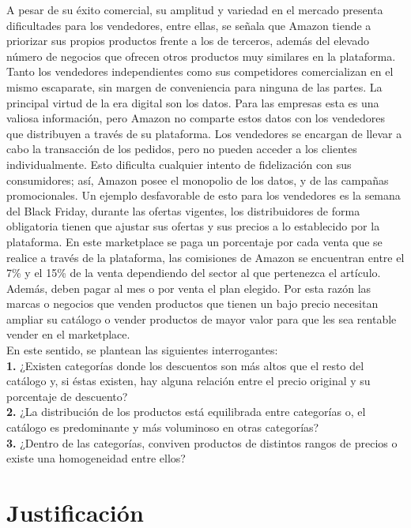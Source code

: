\documentclass[oneside,11pt]{Latex/Classes/PhDthesisPSnPDF}
\begin{document}
A pesar de su éxito comercial, su amplitud y variedad en el mercado
presenta dificultades para los vendedores, entre ellas, se señala que
Amazon tiende a priorizar sus propios productos frente a los de
terceros, además del elevado número de negocios que ofrecen otros
productos muy similares en la plataforma. Tanto los vendedores
independientes como sus competidores comercializan en el mismo
escaparate, sin margen de conveniencia para ninguna de las partes. La
principal virtud de la era digital son los datos. Para las empresas esta
es una valiosa información, pero Amazon no comparte estos datos con los
vendedores que distribuyen a través de su plataforma. Los vendedores se
encargan de llevar a cabo la transacción de los pedidos, pero no pueden
acceder a los clientes individualmente. Esto dificulta cualquier intento
de fidelización con sus consumidores; así, Amazon posee el monopolio de
los datos, y de las campañas promocionales. Un ejemplo desfavorable de
esto para los vendedores es la semana del Black Friday, durante las
ofertas vigentes, los distribuidores de forma obligatoria tienen que
ajustar sus ofertas y sus precios a lo establecido por la plataforma. En
este marketplace se paga un porcentaje por cada venta que se realice a
través de la plataforma, las comisiones de Amazon se encuentran entre el
7\% y el 15\% de la venta dependiendo del sector al que pertenezca el
artículo. Además, deben pagar al mes o por venta el plan elegido. Por
esta razón las marcas o negocios que venden productos que tienen un bajo
precio necesitan ampliar su catálogo o vender productos de mayor valor
para que les sea rentable vender en el marketplace.\\

En este sentido, se plantean las siguientes interrogantes:\\

\textbf{1.} ¿Existen categorías donde los descuentos son más altos que
el resto del catálogo y, si éstas existen, hay alguna relación entre el
precio original y su porcentaje de descuento?\\

\textbf{2.} ¿La distribución de los productos está equilibrada entre
categorías o, el catálogo es predominante y más voluminoso en otras
categorías?\\

\textbf{3.} ¿Dentro de las categorías, conviven productos de distintos
rangos de precios o existe una homogeneidad entre ellos?\\

\section{Justificación}
\end{document}
